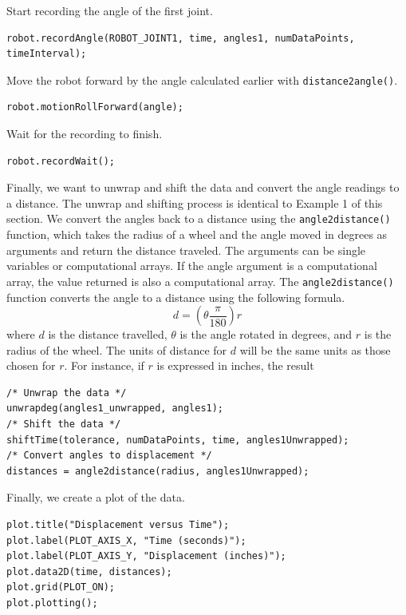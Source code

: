 \documentclass{article}
\begin{document}
Start recording the angle of the first joint.
\begin{verbatim}
robot.recordAngle(ROBOT_JOINT1, time, angles1, numDataPoints, timeInterval);
\end{verbatim}

Move the robot forward by the angle calculated earlier with \texttt{distance2angle()}.
\begin{verbatim}
robot.motionRollForward(angle);
\end{verbatim}

Wait for the recording to finish.
\begin{verbatim}
robot.recordWait();
\end{verbatim}

Finally, we want to unwrap and shift the data and convert the angle readings to a distance.
The unwrap and shifting process is identical to Example 1 of this section. 
We convert the angles back to a distance using the \texttt{angle2distance()} function,
which takes the radius of a wheel and the angle moved in degrees as arguments and
return the distance traveled. The arguments can be single variables or computational
arrays. If the angle argument is a computational array, the value returned is also
a computational array. The \texttt{angle2distance()} function converts the angle
to a distance using the following formula.
\begin{equation*}
d = \left(\theta \frac{\pi}{180}\right) r
\end{equation*}
where $d$ is the distance travelled, $\theta$ is the angle rotated in degrees, and $r$ is the
radius of the wheel. The units of distance for $d$ will be the same units as those
chosen for $r$. For instance, if $r$ is expressed in inches, the result 

\begin{verbatim}
/* Unwrap the data */
unwrapdeg(angles1_unwrapped, angles1);
/* Shift the data */
shiftTime(tolerance, numDataPoints, time, angles1Unwrapped);
/* Convert angles to displacement */
distances = angle2distance(radius, angles1Unwrapped);
\end{verbatim}

Finally, we create a plot of the data.
\begin{verbatim}
plot.title("Displacement versus Time");
plot.label(PLOT_AXIS_X, "Time (seconds)");
plot.label(PLOT_AXIS_Y, "Displacement (inches)");
plot.data2D(time, distances);
plot.grid(PLOT_ON);
plot.plotting();
\end{verbatim}
\end{document}
